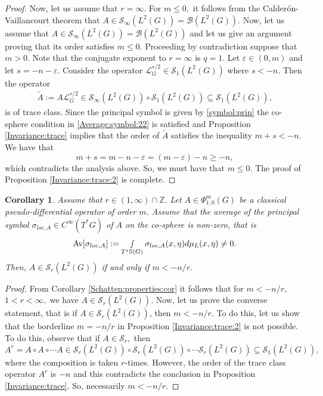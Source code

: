 \documentclass[12pt, reqno]{amsart}
\newtheorem{corollary}[theorem]{Corollary}
\theoremstyle{definition}
\theoremstyle{remark}
\numberwithin{equation}{section}
\begin{document}
\begin{proof}
Now, let us assume that $r=\infty.$   For $m\leq 0,$ it follows from the Calder\'on-Vaillancourt theorem that $A\in \mathscr{S}_{\infty}(L^2(G))=\mathscr{B}(L^2(G)).$  Now, let us assume that $A\in \mathscr{S}_\infty(L^2(G))=\mathscr{B}(L^2(G))$ and let us give an argument proving that its order satisfies $m\leq 0.$ Proceeding by contradiction suppose that  $m>0.$ Note that the conjugate exponent to $r=\infty$ is $q=1.$ Let $\varepsilon\in (0,m)$ and let $s=-n-\varepsilon.$ Consider the operator $\mathcal{L}_G^{s/2}\in \mathscr{S}_1(L^2(G))$ where $s<-n$. Then  the operator
\begin{align*}
   \tilde{A}:=A\mathcal{L}_G^{s/2}\in \mathscr{S}_\infty(L^2(G))\circ \mathscr{S}_1(L^2(G))\subseteq \mathscr{S}_1(L^2(G)),
\end{align*} is of trace class. Since the principal symbol is given by \eqref{symbol:prin} the co-sphere condition in \eqref{Average:symbol:22} is satisfied and Proposition  \ref{Invariance:trace} implies that the order of $\tilde A$ satisfies the inequality $m+s<-n.$ We have that $$ m+s= m-n-\varepsilon= (m-\varepsilon)-n\geq -n, $$ which contradicts the analysis above. So, we must have that $m\leq 0. $  
 The proof of Proposition \ref{Invariance:trace:2} is complete.
\end{proof}
\begin{corollary}\label{Classificaton:r}
    Assume that $r\in (1,\infty)\cap \mathbb{Z}.$ Let $A\in \Psi^{m}_{1,0}(G)$ be a classical pseudo-differential operator of order $m$. Assume that the average of the principal symbol $\sigma_{loc,A}\in C^\infty(T^*G)$ of $A$ on the co-sphere is non-zero, that is
\begin{equation}\label{Average:symbol:22:cor}
    \textnormal{Av}[\sigma_{loc,A}]:=\smallint\limits_{ T^{*}\mathbb{S}(G)}\sigma_{loc,A}(x,\eta)d\mu_{L}(x,\eta)\neq 0.
\end{equation}
Then, $A\in \mathscr{S}_r(L^2(G))$  if and only if    $m<-n/r.$ 
\end{corollary}
\begin{proof}From Corollary \ref{Schatten:properties:cor} it follows that for $m<-n/r,$ $1<r<\infty,$ we have $A\in \mathscr{S}_r(L^2(G)).$ Now, let us prove the converse statement, that is if $A\in \mathscr{S}_r(L^2(G))$, then $m<-n/r.$ To do this, let us show that the borderline $m=-n/r$ in Proposition \ref{Invariance:trace:2} is not possible. To do this, observe that if $A\in \mathscr{S}_r,$ then
\begin{equation}
    A^r=A\circ A\circ\cdots A\in \mathscr{S}_r(L^2(G))\circ \mathscr{S}_r(L^2(G))\circ\cdots \mathscr{S}_r(L^2(G))\subseteq \mathscr{S}_{1}(L^2(G)),
\end{equation} where the composition is taken $r$-times. However, the order of the trace class operator $A^r$ is $-n$ and this contradicts the conclusion in Proposition \ref{Invariance:trace}. So, necessarily $m<-n/r.$     
\end{proof}
\end{document}
